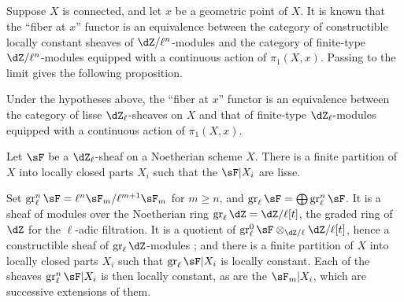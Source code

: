 \subsection{}\label{II:2-3}

Suppose $X$ is connected, and let $x$ be a geometric point of $X$. It is
known that the ``fiber at $x$'' functor is an equivalence between the
category of constructible locally constant sheaves of
$\dZ/\ell^n$-modules and the category of finite-type
$\dZ/\ell^n$-modules equipped with a continuous action of $\pi_1(X,x)$.
Passing to the limit gives the following proposition.






\begin{proposition_}\label{II:2-4}
Under the hypotheses above, the ``fiber at $x$'' functor is an equivalence
between the category of lisse $\dZ_\ell$-sheaves on $X$ and that of
finite-type $\dZ_\ell$-modules equipped with a continuous action of
$\pi_1(X,x)$.
\end{proposition_}






\begin{proposition_}\label{II:2-5}
Let $\sF$ be a $\dZ_\ell$-sheaf on a Noetherian scheme $X$. There is a finite
partition of $X$ into locally closed parts $X_i$ such that the $\sF|X_i$ are
lisse.
\end{proposition_}

Set $\gr_\ell^n\sF=\ell^n\sF_m/\ell^{m+1}\sF_m$ for $m\geqslant n$, and
$\gr_\ell\sF=\bigoplus \gr_\ell^n\sF$. It is a sheaf of modules over the
Noetherian ring $\gr_\ell\dZ=\dZ/\ell[t]$, the graded ring of $\dZ$ for the
$\ell$-adic filtration. It is a quotient of
$\gr_\ell^0\sF \otimes_{\dZ/\ell} \dZ/\ell[t]$, hence a constructible sheaf
of $\gr_\ell\dZ$-modules \cite[IX.2]{sga4}; and there is a finite partition
of $X$ into locally closed parts $X_i$ such that
$\gr_\ell \sF|X_i$ is locally constant. Each of the sheaves
$\gr_\ell^n\sF|X_i$ is then locally constant, as are the $\sF_m|X_i$, which
are successive extensions of them.






\subsection{}\label{II:2-6}

